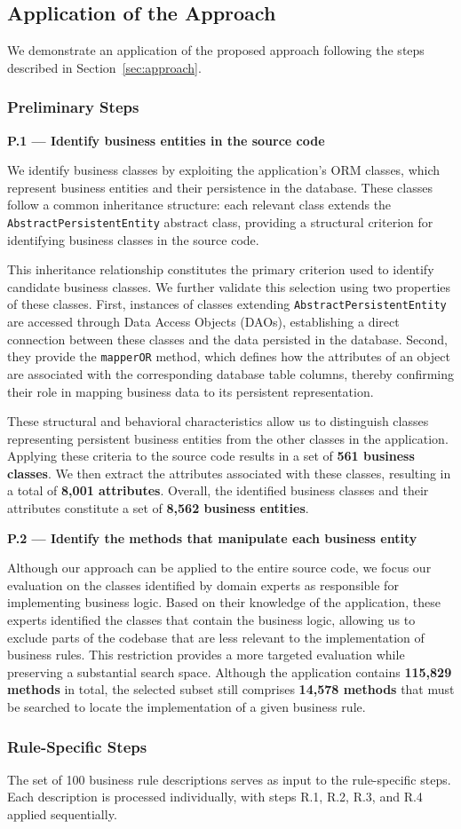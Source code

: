 \subsection{Application of the Approach}

We demonstrate an application of the proposed approach following the steps described in Section~\ref{sec:approach}.

\subsubsection{Preliminary Steps}\noindent

\textbf{P.1 — Identify business entities in the source code}

We identify business classes by exploiting the application's ORM classes, which represent business entities and their persistence in the database. These classes follow a common inheritance structure: each relevant class extends the \texttt{AbstractPersistentEntity} abstract class, providing a structural criterion for identifying business classes in the source code.

This inheritance relationship constitutes the primary criterion used to identify candidate business classes. We further validate this selection using two properties of these classes. First, instances of classes extending \texttt{AbstractPersistentEntity} are accessed through Data Access Objects (DAOs), establishing a direct connection between these classes and the data persisted in the database. Second, they provide the \texttt{mapperOR} method, which defines how the attributes of an object are associated with the corresponding database table columns, thereby confirming their role in mapping business data to its persistent representation.

These structural and behavioral characteristics allow us to distinguish classes representing persistent business entities from the other classes in the application. Applying these criteria to the source code results in a set of \textbf{561 business classes}. We then extract the attributes associated with these classes, resulting in a total of \textbf{8,001 attributes}. Overall, the identified business classes and their attributes constitute a set of \textbf{8,562 business entities}.

\textbf{P.2 — Identify the methods that manipulate each business entity}

Although our approach can be applied to the entire source code, we focus our evaluation on the classes identified by domain experts as responsible for implementing business logic. Based on their knowledge of the application, these experts identified the classes that contain the business logic, allowing us to exclude parts of the codebase that are less relevant to the implementation of business rules. This restriction provides a more targeted evaluation while preserving a substantial search space. Although the application contains \textbf{115,829 methods} in total, the selected subset still comprises \textbf{14,578 methods} that must be searched to locate the implementation of a given business rule.

\subsubsection{Rule-Specific Steps}\noindent

The set of 100 business rule descriptions serves as input to the rule-specific steps. Each description is processed individually, with steps R.1, R.2, R.3, and R.4 applied sequentially.